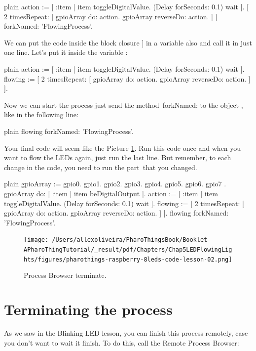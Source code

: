 \documentclass[10pt,twoside,english]{_support/latex/sbabook/sbabook}
\begin{document}
\begin{displaycode}{plain}
action := [ :item | item toggleDigitalValue. (Delay forSeconds: 0.1) wait ].
[ 2 timesRepeat: [
    gpioArray do: action.
    gpioArray reverseDo: action.
] ] forkNamed: 'FlowingProcess'.
\end{displaycode}

We can put the code inside the block closure \symbol{34}{[} {]} in a variable also and call it in just one line. Let's put it inside the variable :

\begin{displaycode}{plain}
action := [ :item | item toggleDigitalValue. (Delay forSeconds: 0.1) wait ].
flowing := [ 2 timesRepeat: [
    gpioArray do: action.
    gpioArray reverseDo: action.
] ].
\end{displaycode}

Now we can start the process just send the method forkNamed: to the object , like in the following line:

\begin{displaycode}{plain}
flowing forkNamed: 'FlowingProcess'.
\end{displaycode}

Your final code will seem like the Picture \ref{Process8LEDs}. Run this code once and when you want to flow the LEDs again, just run the last line. But remember, to each change in the code, you need to run the part that you changed. 

\begin{displaycode}{plain}
gpioArray := { gpio0. gpio1. gpio2. gpio3. gpio4. gpio5. gpio6. gpio7 }.
gpioArray do: [ :item | item beDigitalOutput ].
action := [ :item | item toggleDigitalValue. (Delay forSeconds: 0.1) wait ].
flowing := [ 2 timesRepeat: [
	gpioArray do: action.
	gpioArray reverseDo: action.
] ].
flowing forkNamed: 'FlowingProcess'.
\end{displaycode}


\begin{figure}

\begin{center}
\texttt{[image: /Users/allexoliveira/PharoThingsBook/Booklet-APharoThingTutorial/\_result/pdf/Chapters/Chap5LEDFlowingLights/figures/pharothings-raspberry-8leds-code-lesson-02.png]}\caption{Process Browser terminate.\label{Process8LEDs}}\end{center}
\end{figure}

\section{Terminating the process}
As we saw in the Blinking LED lesson, you can finish this process remotely, case you don’t want to wait it finish. To do this, call the Remote Process Browser:
\end{document}
